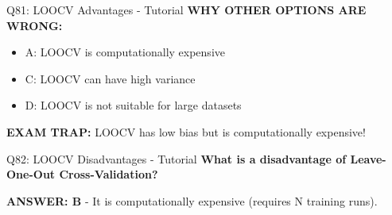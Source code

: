 \documentclass[8pt]{beamer}
\begin{document}
\begin{frame}{Q81: LOOCV Advantages - Tutorial}
		\vspace{0.05cm}
		\textcolor{myred}{\textbf{WHY OTHER OPTIONS ARE WRONG:}}
		\begin{itemize}
			\item \textcolor{myred}{A:} LOOCV is computationally expensive
			\item \textcolor{myred}{C:} LOOCV can have high variance
			\item \textcolor{myred}{D:} LOOCV is not suitable for large datasets
		\end{itemize}
		
		\textcolor{myred}{\textbf{EXAM TRAP:}} LOOCV has low bias but is computationally expensive!
	\end{frame}
	
	\begin{frame}{Q82: LOOCV Disadvantages - Tutorial}
		\fontsize{6.5}{7.5}\selectfont
		\textbf{What is a disadvantage of Leave-One-Out Cross-Validation?}
		
		\vspace{0.05cm}
		\textcolor{myblue}{\textbf{ANSWER: B}} - It is computationally expensive (requires N training runs).
		

\end{frame}
\end{document}
